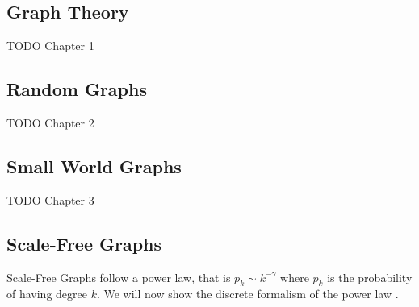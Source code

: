 \documentclass{article}
\begin{document}
        \subsection{Graph Theory}
        TODO Chapter 1
        \subsection{Random Graphs}
        TODO Chapter 2
        \subsection{Small World Graphs}
        TODO Chapter 3
        \subsection{Scale-Free Graphs}
        Scale-Free Graphs follow a power law, that is $p_{k} \sim k^{-\gamma}$ where $p_{k}$ is the probability of having degree $k$. We will now show the discrete formalism of the power law \parencite{barabasi2013network}.
\end{document}
